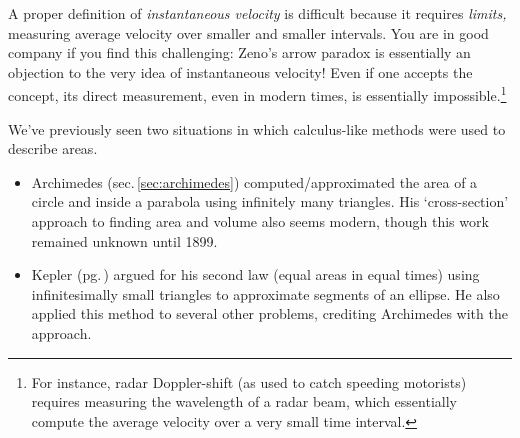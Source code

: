 A proper definition of \emph{instantaneous velocity} is difficult because it requires \emph{limits,} measuring average velocity over smaller and smaller intervals. You are in good company if you find this challenging: Zeno's arrow paradox is essentially an objection to the very idea of instantaneous velocity! Even if one accepts the concept, its direct measurement, even in modern times, is essentially impossible.\footnote{For instance, radar Doppler-shift (as used to catch speeding motorists) requires measuring the wavelength of a radar beam, which essentially compute the average velocity over a very small time interval. %
}\smallbreak


We've previously seen two situations in which calculus-like methods were used to describe areas.
\begin{itemize}
  \item Archimedes (sec.\,\ref{sec:archimedes}) computed/approximated the area of a circle and inside a parabola using infinitely many triangles. His `cross-section' approach to finding area and volume also seems modern, though this work remained unknown until 1899.
  \item Kepler (pg.\,\pageref{pg:kepler2}) argued for his second law (equal areas in equal times) using infinitesimally small triangles to approximate segments of an ellipse. He also applied this method to several other problems, crediting Archimedes with the approach.
\end{itemize}

